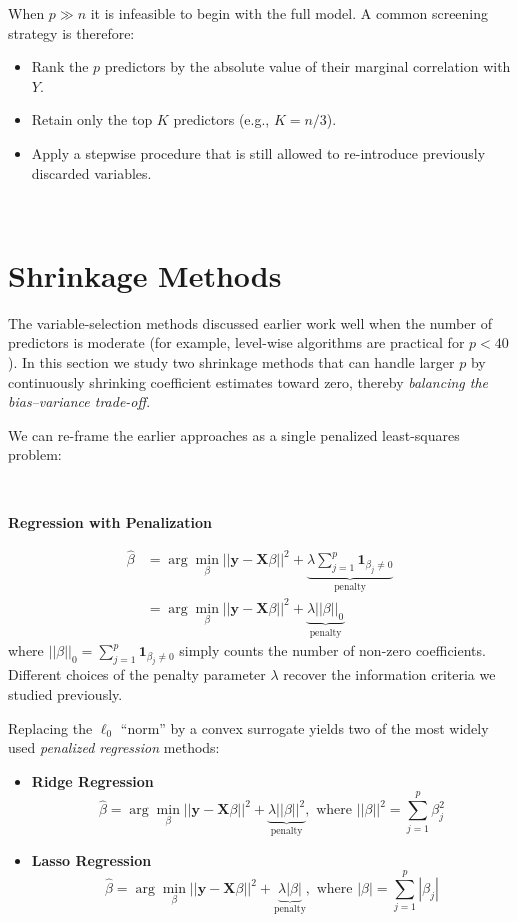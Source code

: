 \documentclass[
]{book}
\begin{document}
When \(p\gg n\) it is infeasible to begin with the full model. A common screening strategy is therefore:

\begin{itemize}
\item
  Rank the \(p\) predictors by the absolute value of their marginal correlation with \(Y\).
\item
  Retain only the top \(K\) predictors (e.g., \(K=n/3\)).
\item
  Apply a stepwise procedure that is still allowed to re-introduce previously discarded variables.
\end{itemize}

~

\section{Shrinkage Methods}\label{shrinkage-methods}

The variable-selection methods discussed earlier work well when the number of predictors is moderate (for example, level-wise algorithms are practical for \(p<40\)). In this section we study two shrinkage methods that can handle larger \(p\) by continuously shrinking coefficient estimates toward zero, thereby \emph{balancing the bias--variance trade-off}.

We can re-frame the earlier approaches as a single penalized least-squares problem:

~

\textbf{Regression with Penalization}

\begin{align*}
\hat{\beta} &= \arg\min_{\beta} ||\mathbf{y} - \mathbf{X}\beta||^2 + \underbrace{\lambda \sum_{j=1}^{p} \mathbf{1}_{\beta_j \neq 0}}_{\text{penalty}}\\
&=  \arg\min_{\beta} ||\mathbf{y} - \mathbf{X}\beta||^2 + \underbrace{\lambda ||\beta||_0}_{\text{penalty}}
\end{align*}
where \(||\beta||_0 = \sum_{j=1}^{p} \mathbf{1}_{\beta_j \neq 0}\) simply counts the number of non-zero coefficients. Different choices of the penalty parameter \(\lambda\) recover the information criteria we studied previously.

Replacing the \(\ell_0\) ``norm'' by a convex surrogate yields two of the most widely used \emph{penalized regression} methods:

\begin{itemize}
\item
  \textbf{Ridge Regression}
  \[\hat{\beta} =  \arg\min_{\beta} ||\mathbf{y} - \mathbf{X}\beta||^2 + \underbrace{\lambda ||\beta||^2}_{\text{penalty}}, \text{ where } ||\beta||^2 = \sum_{j=1}^{p} \beta_j^2\]
\item
  \textbf{Lasso Regression}
  \[\hat{\beta} =  \arg\min_{\beta} ||\mathbf{y} - \mathbf{X}\beta||^2 + \underbrace{\lambda |\beta|}_{\text{penalty}}, \text{ where }  |\beta| = \sum_{j=1}^{p} |\beta_j|\]
\end{itemize}
\end{document}
